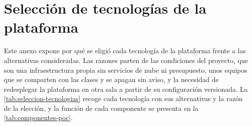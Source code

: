 \chapter{Selección de tecnologías de la plataforma}\label{anx:tecnologias}

Este anexo expone por qué se eligió cada tecnología de la plataforma frente a las alternativas consideradas. Las razones parten de las condiciones del proyecto, que son una infraestructura propia sin servicios de nube ni presupuesto, unos equipos que se comparten con las clases y se apagan sin aviso, y la necesidad de redesplegar la plataforma en otra sala a partir de su configuración versionada. La \cref{tab:seleccion-tecnologias} recoge cada tecnología con sus alternativas y la razón de la elección, y la función de cada componente se presenta en la \cref{tab:componentes-poc}.

